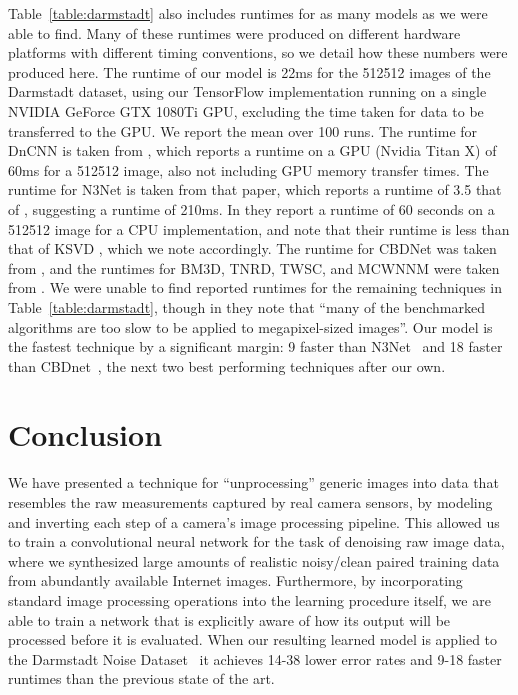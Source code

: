 \documentclass[10pt,twocolumn,letterpaper]{article}
\begin{document}
Table~\ref{table:darmstadt} also includes runtimes for as many models as we were able to find. Many of these runtimes were produced on different hardware platforms with different timing conventions, so we detail how these numbers were produced here.
The runtime of our model is 22ms for the 512512 images of the Darmstadt dataset, using our TensorFlow implementation running on a single NVIDIA GeForce GTX 1080Ti GPU, excluding the time taken for data to be transferred to the GPU. We report the mean over 100 runs.
The runtime for DnCNN is taken from \cite{Zhang2017}, which reports a runtime on a GPU (Nvidia Titan X) of 60ms for a 512512 image, also not including GPU memory transfer times.
The runtime for N3Net \cite{NNN} is taken from that paper, which reports a runtime of 3.5 that of \cite{Zhang2017}, suggesting a runtime of 210ms.
In \cite{MLP} they report a runtime of 60 seconds on a 512512 image for a CPU implementation, and note that their runtime is less than that of KSVD \cite{KSVD}, which we note accordingly.
The runtime for CBDNet was taken from \cite{CBDnet}, and the runtimes for BM3D, TNRD, TWSC, and MCWNNM were taken from \cite{TWSC}.
We were unable to find reported runtimes for the remaining techniques in Table~\ref{table:darmstadt}, though in \cite{plotz2017cvpr} they note that  ``many of the benchmarked algorithms are too slow to be applied to megapixel-sized images''.
Our model is the fastest technique by a significant margin: 9 faster than N3Net~\cite{NNN} and 18 faster than CBDnet~\cite{CBDnet}, the next two best performing techniques after our own.

\section{Conclusion}

We have presented a technique for ``unprocessing'' generic images into 
data that resembles the raw measurements captured by real camera sensors, by modeling and inverting each step of a camera's image processing pipeline.
This allowed us to train a convolutional neural network for the task of denoising raw image data, where we synthesized large amounts of realistic noisy/clean paired training data from abundantly available Internet images.
Furthermore, by incorporating standard image processing operations into the learning procedure itself, we are able to train a network that is explicitly aware of how its output will be processed before it is evaluated.
When our resulting learned model is applied to the Darmstadt Noise Dataset~\cite{plotz2017cvpr} it achieves 14-38 lower error rates and 9-18 faster runtimes than the previous state of the art.

{\small


}
\end{document}
